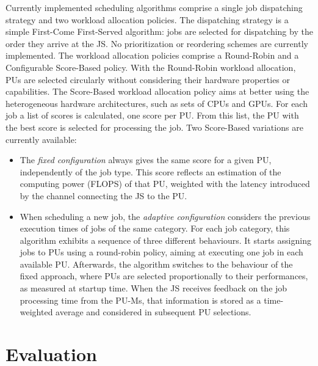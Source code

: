 \documentclass[runningheads,a4paper]{llncs}
\newcommand{\td}[1]{\todo[inline]{#1}}
\begin{document}
Currently implemented scheduling algorithms comprise a single job dispatching strategy and two workload allocation policies. The dispatching strategy is a simple First-Come First-Served algorithm: jobs are selected for dispatching by the order they arrive at the JS\@. No prioritization or reordering schemes are currently implemented. The workload allocation policies comprise a Round-Robin and a Configurable Score-Based policy.
%
With the Round-Robin workload allocation, PUs are selected circularly without considering their hardware properties or capabilities.
%
The Score-Based workload allocation policy aims at better using the heterogeneous hardware architectures, such as sets of CPUs and GPUs. For each job a list of scores is calculated, one score per PU\@. From this list, the PU with the best score is selected for processing the job. Two Score-Based variations are currently available:


\begin{itemize}
  \item The \emph{fixed configuration} always gives the same score for a given PU, independently of the job type. This score reflects an estimation of the computing power (FLOPS) of that PU, weighted with the latency introduced by the channel connecting the JS to the PU.
  \item When scheduling a new job, the \emph{adaptive configuration} considers the previous execution times of jobs of the same category. For each job category, this algorithm exhibits a sequence of three different behaviours. It starts assigning jobs to PUs using a round-robin policy, aiming at executing one job in each available PU\@. Afterwards, the algorithm switches to the behaviour of the fixed approach, where PUs are selected proportionally to their performances, as measured at startup time. When the JS receives feedback on the job processing time from the PU-Ms, that information is stored as a time-weighted average and considered in subsequent PU selections.
\end{itemize}


% 
% 




\section{Evaluation}
\label{sec:evaluation}
\end{document}
